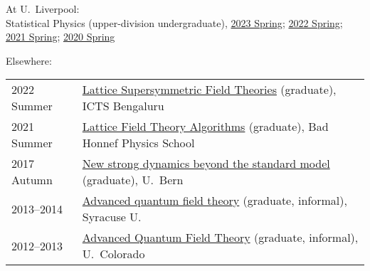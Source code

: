 \documentclass[10 pt]{article}
\renewcommand{\section}[2]%
    {\pagebreak[2]\vspace{1.3\baselineskip}%
     \hspace{0in}%
     \marginpar{
     \raggedright \scshape #1}#2}
\newenvironment{tightlist}
  {\begin{list} {} {\setlength{\topsep}{-8 pt} \setlength{\itemsep}{-3 pt} \setlength{\leftmargin}{0 mm}}}{\end{list}}
\begin{document}
\section{Teaching} %

\vspace{-12 pt} %
\begin{tightlist}
  \item At U.~Liverpool: \\[2 pt]
        \quad Statistical Physics (upper-division undergraduate), \href{http://davidschaich.net/teaching/2223S_StatPhys/index.html}{2023 Spring}; \href{http://davidschaich.net/teaching/2122S_StatPhys/index.html}{2022 Spring}; \\ \hfill \href{http://davidschaich.net/teaching/2021S_StatPhys/index.html}{2021 Spring}; \href{http://davidschaich.net/teaching/1920S_StatPhys/index.html}{2020 Spring}
  \vspace{12 pt}
  \item Elsewhere: \\[2 pt]
    \begin{tabular}[t]{ll}
      2022 Summer & \href{http://www.davidschaich.net/teaching/2022summer_ICTS/index.html}{Lattice Supersymmetric Field Theories} (graduate), ICTS Bengaluru \\
      2021 Summer & \href{http://www.davidschaich.net/teaching/2021summer_BadHonnef/index.html}{Lattice Field Theory Algorithms} (graduate), Bad Honnef Physics School \\
      2017 Autumn & \href{http://www.davidschaich.net/teaching/1718F_BSM/index.html}{New strong dynamics beyond the standard model} (graduate), U.~Bern \\
      2013--2014  & \href{http://www.davidschaich.net/teaching/1314_AdQFT/index.html}{Advanced quantum field theory} (graduate, informal), Syracuse U.  \\
      2012--2013  & \href{http://www.davidschaich.net/teaching/1213_AdQFT/index.html}{Advanced Quantum Field Theory} (graduate, informal), U.~Colorado  \\
    \end{tabular}
\end{tightlist}
\end{document}
